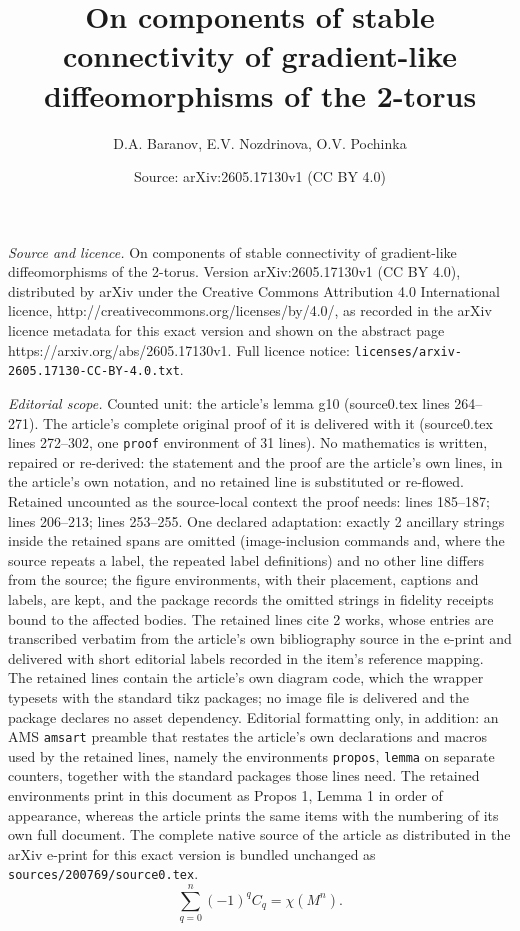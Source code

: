 \documentclass[10pt,a4paper]{amsart}
\title{On components of stable connectivity of gradient-like diffeomorphisms of the 2-torus}
\author{D.A. Baranov, E.V. Nozdrinova, O.V. Pochinka}
\date{Source: arXiv:2605.17130v1 (CC BY 4.0)}
\begin{document}
\maketitle

\noindent\emph{Source and licence.} On components of stable connectivity of gradient-like diffeomorphisms of the 2-torus. Version arXiv:2605.17130v1 (CC BY 4.0), distributed by arXiv under the Creative Commons Attribution 4.0 International licence, http://creativecommons.org/licenses/by/4.0/, as recorded in the arXiv licence metadata for this exact version and shown on the abstract page https://arxiv.org/abs/2605.17130v1. Full licence notice: \texttt{licenses/arxiv-2605.17130-CC-BY-4.0.txt}.\par\smallskip

\noindent\textit{Editorial scope.} Counted unit: the article's lemma g10 (source0.tex lines 264--271). The article's complete original proof of it is delivered with it (source0.tex lines 272--302, one \texttt{proof} environment of 31 lines). No mathematics is written, repaired or re-derived: the statement and the proof are the article's own lines, in the article's own notation, and no retained line is substituted or re-flowed.  Retained uncounted as the source-local context the proof needs: lines 185--187; lines 206--213; lines 253--255.  One declared adaptation: exactly 2 ancillary strings inside the retained spans are omitted (image-inclusion commands and, where the source repeats a label, the repeated label definitions) and no other line differs from the source; the figure environments, with their placement, captions and labels, are kept, and the package records the omitted strings in fidelity receipts bound to the affected bodies.  The retained lines cite 2 works, whose entries are transcribed verbatim from the article's own bibliography source in the e-print and delivered with short editorial labels recorded in the item's reference mapping.  The retained lines contain the article's own diagram code, which the wrapper typesets with the standard tikz packages; no image file is delivered and the package declares no asset dependency.  Editorial formatting only, in addition: an AMS \texttt{amsart} preamble that restates the article's own declarations and macros used by the retained lines, namely the environments \texttt{propos}, \texttt{lemma} on separate counters, together with the standard packages those lines need.  The retained environments print in this document as Propos 1, Lemma 1 in order of appearance, whereas the article prints the same items with the numbering of its own full document.  The complete native source of the article as distributed in the arXiv e-print for this exact version is bundled unchanged as \texttt{sources/200769/source0.tex}.
		\begin{equation}\label{sum}
			\sum\limits_{q=0}^n(-1)^q C_q= \chi(M^n).
		\end{equation}
\end{document}
